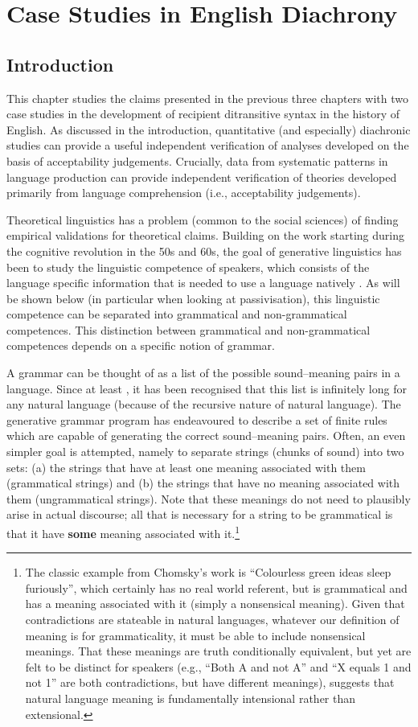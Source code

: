 \chapter{Case Studies in English Diachrony}\label{ch:diachron}
\section{Introduction}
This chapter studies the claims presented in the previous three chapters with two case studies in the development of recipient ditransitive syntax in the history of English. As discussed in the introduction, quantitative (and especially) diachronic studies can provide a useful independent verification of analyses developed on the basis of acceptability judgements. Crucially, data from systematic patterns in language production can provide independent verification of theories developed primarily from language comprehension (i.e., acceptability judgements).

Theoretical linguistics has a problem (common to the social sciences) of finding empirical validations for theoretical claims. Building on the work starting during the cognitive revolution in the 50s and 60s, the goal of generative linguistics has been to study the linguistic competence of speakers, which consists of the language specific information that is needed to use a language natively \citep{Chomsky.1981,Chomsky.1986}. As will be shown below (in particular when looking at passivisation), this linguistic competence can be separated into grammatical and non-grammatical competences. This distinction between grammatical and non-grammatical competences depends on a specific notion of grammar.

A grammar can be thought of as a list of the possible sound--meaning pairs in a language. Since at least \cite{Chomsky.1957}, it has been recognised that this list is infinitely long for any natural language (because of the recursive nature of natural language). The generative grammar program has endeavoured to describe a set of finite rules which are capable of generating the correct sound--meaning pairs. Often, an even simpler goal is attempted, namely to separate strings (chunks of sound) into two sets: (a) the strings that have at least one meaning associated with them (grammatical strings) and (b) the strings that have no meaning associated with them (ungrammatical strings). Note that these meanings do not need to plausibly arise in actual discourse; all that is necessary for a string to be grammatical is that it have \textbf{some} meaning associated with it.\footnote{The classic example from Chomsky's work is ``Colourless green ideas sleep furiously'', which certainly has no real world referent, but is grammatical and has a meaning associated with it (simply a nonsensical meaning). Given that contradictions are stateable in natural languages, whatever our definition of meaning is for grammaticality, it must be able to include nonsensical meanings. That these meanings are truth conditionally equivalent, but yet are felt to be distinct for speakers (e.g., ``Both A and not A'' and ``X equals 1 and not 1'' are both contradictions, but have different meanings), suggests that natural language meaning is fundamentally intensional rather than extensional.}

